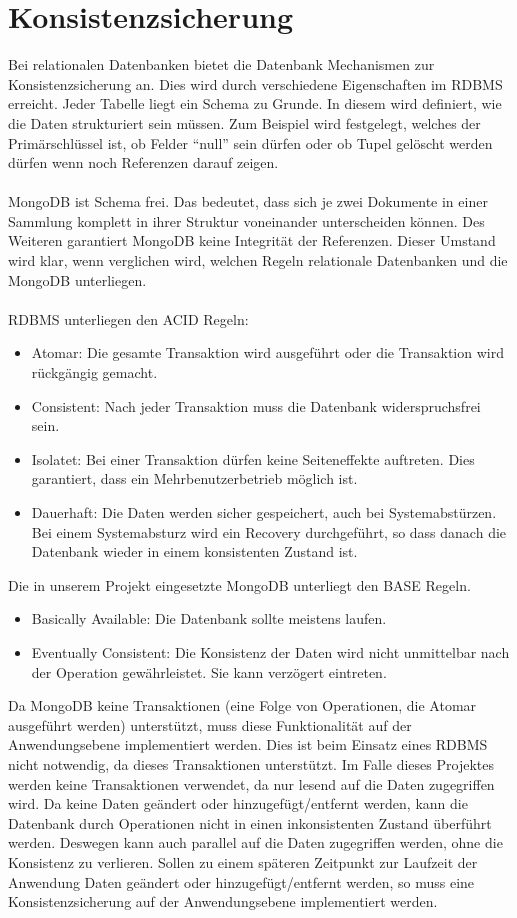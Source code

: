  \section{Konsistenzsicherung}
 Bei relationalen Datenbanken bietet die Datenbank Mechanismen zur Konsistenzsicherung 
 an. Dies wird durch verschiedene Eigenschaften im RDBMS
 erreicht. Jeder Tabelle liegt ein Schema zu Grunde. In diesem wird definiert,
 wie die Daten strukturiert sein müssen. Zum Beispiel wird festgelegt, welches
 der Primärschlüssel ist, ob Felder ``null'' sein dürfen oder ob Tupel gelöscht
 werden dürfen wenn noch Referenzen darauf zeigen.
 \\\\
 MongoDB ist Schema frei. Das bedeutet, dass sich je zwei Dokumente in einer
 Sammlung  komplett in ihrer Struktur voneinander unterscheiden können.
 Des Weiteren garantiert MongoDB keine Integrität der Referenzen. Dieser Umstand
 wird klar, wenn verglichen wird, welchen Regeln relationale Datenbanken und
 die MongoDB unterliegen.
 \\\\
 \noindent
 RDBMS unterliegen den ACID Regeln:
 \begin{itemize}
   \item Atomar: Die gesamte Transaktion wird ausgeführt oder die Transaktion
   wird rückgängig gemacht.
   \item Consistent: Nach jeder Transaktion muss die Datenbank widerspruchsfrei
   sein.
   \item Isolatet: Bei einer Transaktion dürfen keine Seiteneffekte
   auftreten. Dies garantiert, dass ein Mehrbenutzerbetrieb möglich ist.
   \item Dauerhaft: Die Daten werden sicher gespeichert, auch bei
   Systemabstürzen. Bei einem Systemabsturz wird ein Recovery durchgeführt, so 
   dass danach die Datenbank wieder in einem konsistenten Zustand ist.
 \end{itemize}
 Die in unserem Projekt eingesetzte MongoDB unterliegt den BASE Regeln.
 \begin{itemize}
   \item Basically Available: Die Datenbank sollte meistens laufen.
   \item Eventually Consistent: Die Konsistenz der Daten wird nicht unmittelbar
   nach der Operation gewährleistet. Sie kann verzögert eintreten.
\end{itemize}
\noindent
Da MongoDB keine Transaktionen (eine Folge von Operationen, die Atomar
ausgeführt werden) unterstützt, muss diese Funktionalität auf der
Anwendungsebene implementiert werden. Dies ist beim Einsatz eines RDBMS nicht
notwendig, da dieses Transaktionen unterstützt. Im Falle dieses Projektes werden keine
Transaktionen verwendet, da nur lesend auf die Daten zugegriffen wird.
Da keine Daten geändert oder hinzugefügt/entfernt werden,
kann die Datenbank durch Operationen nicht in einen inkonsistenten Zustand
überführt werden. Deswegen kann auch parallel auf die Daten zugegriffen
werden, ohne die Konsistenz zu verlieren. Sollen zu einem späteren Zeitpunkt zur
Laufzeit der Anwendung Daten geändert oder hinzugefügt/entfernt werden,
 so muss eine Konsistenzsicherung auf der Anwendungsebene  implementiert werden.